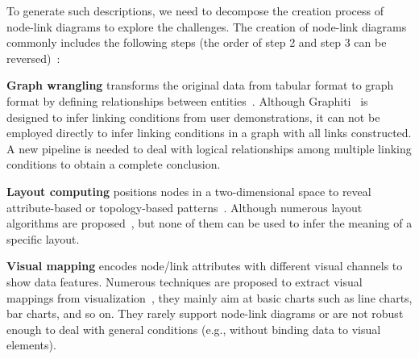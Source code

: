 To generate such descriptions, we need to decompose the creation process of node-link diagrams to explore the challenges.
The creation of node-link diagrams commonly includes the following steps (the order of step 2 and step 3 can be reversed)~\cite{DBLP:journals/cgf/SpritzerBDFF15, tvcg/RomatAP21}:
\begin{compactenum}
\item \textbf{Graph wrangling} transforms the original data from tabular format to graph format by defining relationships between entities~\cite{DBLP:journals/tvcg/SrinivasanPEB18, DBLP:conf/ieeevast/BigelowNML19, DBLP:journals/ivs/HeerP14, DBLP:journals/ivs/LiuNS14}.
Although Graphiti~\cite{DBLP:journals/tvcg/SrinivasanPEB18} is designed to infer linking conditions from user demonstrations, it can not be employed directly to infer linking conditions in a graph with all links constructed.
A new pipeline is needed to deal with logical relationships among multiple linking conditions to obtain a complete conclusion.

\item \textbf{Layout computing} positions nodes in a two-dimensional space to reveal attribute-based or topology-based patterns~\cite{DBLP:journals/cgf/NobreMSL19}.
Although numerous layout algorithms are proposed~\cite{}, but none of them can be used to infer the meaning of a specific layout.

\item \textbf{Visual mapping} encodes node/link attributes with different visual channels to show data features. 
Numerous techniques are proposed to extract visual mappings from visualization~\cite{},  they mainly aim at basic charts such as line charts, bar charts, and so on.
They rarely support node-link diagrams or are not robust enough to deal with general conditions (e.g., without binding data to visual elements).
\end{compactenum}


